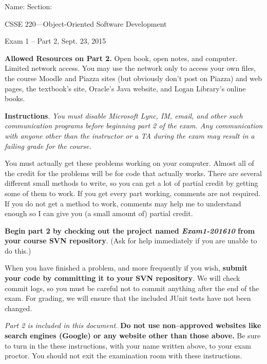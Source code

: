 \documentclass[12pt,twoside]{article}
\newcommand{\fillInBlank}[1][0.5in]{\underline{\hspace{#1}}}
\begin{document}

\begin{flushright}
Name: \fillInBlank[3in] Section: \fillInBlank[1in]

\LARGE{CSSE 220---Object-Oriented Software Development}

\Large{Exam 1 -- Part 2, Sept. 23, 2015}
\end{flushright}

\textbf{Allowed Resources on Part 2.} \hspace{0.15in}
Open book, open notes, and computer. Limited network access. You may use the network only to access your own files, the course Moodle and Piazza sites (but obviously don't post on Piazza) and web pages, the textbook's site, Oracle's Java website, and Logan Library's online books.


\textbf{Instructions}.\hspace{0.15in}
\emph{You must disable Microsoft Lync, IM, email, and other such communication programs before beginning part 2 of the exam. Any communication with anyone other than the instructor or a TA during the exam may result in a failing grade for the course.}

You must actually get these problems working on your computer. Almost all of the credit for the problems will be for code that actually works. There are several different small methods to write, so you can get a lot of partial credit by getting some of them to work.  If you get every part working, comments are not required.  If you do not get a method to work, comments may help me to understand enough so I can give you (a small amount of) partial credit.  

\textbf{Begin part 2 by checking out the project named \emph{Exam1-201610} from your course SVN repository}.  (Ask for help immediately if you are unable to do this.)

When you have finished a problem, and more frequently if you wish, \textbf{submit your code by committing it to your SVN repository}.  We will check commit logs, so you must be careful not to commit anything after the end of the exam.  For grading, we will ensure that the included JUnit tests have not been changed.

\emph{Part 2 is included in this document.}
\textbf{Do not use non--approved websites like search engines (Google) or any website other than those above.}  Be sure to turn in the these instructions, with your name written above, to your exam proctor. You should not exit the examination room with these instructions.
\end{document}
